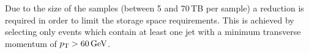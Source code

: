 \renewcommand{\arraystretch}{1.5}
\begin{table}[!h]
\centering
\caption{Available Standard Model background samples containing $\Delta E/\Delta x$ information that are used for background estimation studies.}
\label{tab:SMsamples_RECO}
\end{table}  
Due to the size of the samples (between 5 and 70\,TB per sample) a reduction is required in order to limit the storage space requirements.
This is achieved by selecting only events which contain at least one jet with a minimum transverse momentum of $p_{\text{T}}>60\,\text{Ge}\kern-0.06667em\text{V}$.

